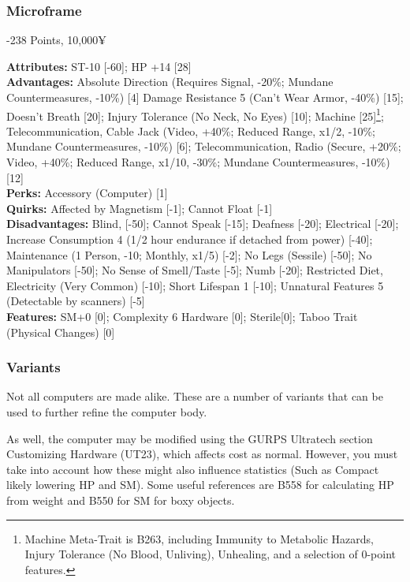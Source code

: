 \begin{multicols*}{3}
	\subsubsection*{Microframe}\label{ai_computer}
	\begin{flushright}
		-238 Points, 10,000¥
	\end{flushright}
	\textbf{Attributes:} 
	ST-10 [-60]; HP +14 [28]
	\\\textbf{Advantages:} 
	Absolute Direction (Requires Signal, -20\%; Mundane Countermeasures, -10\%) [4] Damage Resistance 5 (Can't Wear Armor, -40\%) [15]; Doesn't Breath [20]; Injury Tolerance (No Neck, No Eyes) [10]; Machine [25]\footnote{Machine Meta-Trait is B263, including Immunity to Metabolic Hazards, Injury Tolerance (No Blood, Unliving), Unhealing, and a selection of 0-point features.}; Telecommunication, Cable Jack (Video, +40\%; Reduced Range, x1/2, -10\%; Mundane Countermeasures, -10\%) [6]; Telecommunication, Radio (Secure, +20\%; Video, +40\%; Reduced Range, x1/10, -30\%; Mundane Countermeasures, -10\%) [12]
	\\\textbf{Perks:}
	Accessory (Computer) [1]
	\\\textbf{Quirks:}
	Affected by Magnetism [-1]; Cannot Float [-1]
	\\\textbf{Disadvantages:} 
	Blind, [-50]; Cannot Speak [-15]; Deafness [-20]; Electrical [-20]; Increase Consumption 4 (1/2 hour endurance if detached from power) [-40]; Maintenance (1 Person, -10; Monthly, x1/5) [-2]; No Legs (Sessile) [-50]; No Manipulators [-50]; No Sense of Smell/Taste [-5]; Numb [-20]; Restricted Diet, Electricity (Very Common) [-10]; Short Lifespan 1 [-10]; Unnatural Features 5 (Detectable by scanners) [-5]
	\\\textbf{Features:}
	SM+0 [0]; Complexity 6 Hardware [0]; Sterile[0]; Taboo Trait (Physical Changes) [0]
	
	\subsubsection*{Variants}
	
	Not all computers are made alike. These are a number of variants that can be used to further refine the computer body. 
	
	As well, the computer may be modified using the GURPS Ultratech section Customizing Hardware (UT23), which affects cost as normal. However, you must take into account how these might also influence statistics (Such as Compact likely lowering HP and SM). Some useful references are B558 for calculating HP from weight and B550 for SM for boxy objects.
	

\end{multicols*}
